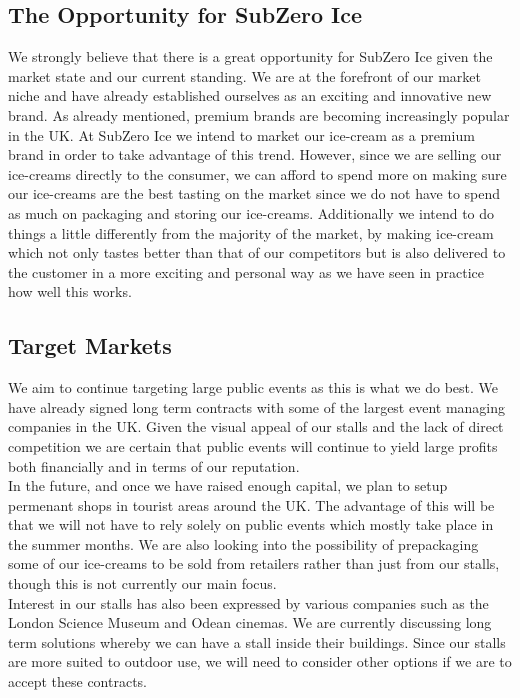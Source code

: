 \documentclass{article}
\begin{document}
  \subsection{The Opportunity for SubZero Ice}

  We strongly believe that there is a great opportunity for SubZero Ice given the market state and our current standing. We are at the forefront of our market niche and have already established ourselves as an exciting and innovative new brand. As already mentioned, premium brands are becoming increasingly popular in the UK. At SubZero Ice we intend to market our ice-cream as a premium brand in order to take advantage of this trend. However, since we are selling our ice-creams directly to the consumer, we can afford to spend more on making sure our ice-creams are the best tasting on the market since we do not have to spend as much on packaging and storing our ice-creams. Additionally we intend to do things a little differently from the majority of the market, by making ice-cream which not only tastes better than that of our competitors but is also delivered to the customer in a more exciting and personal way as we have seen in practice how well this works. \\


  \subsection{Target Markets}

  We aim to continue targeting large public events as this is what we do best. We have already signed long term contracts with some of the largest event managing companies in the UK. Given the visual appeal of our stalls and the lack of direct competition we are certain that public events will continue to yield large profits both financially and in terms of our reputation. \\

  In the future, and once we have raised enough capital, we plan to setup permenant shops in tourist areas around the UK. The advantage of this will be that we will not have to rely solely on public events which mostly take place in the summer months. We are also looking into the possibility of prepackaging some of our ice-creams to be sold from retailers rather than just from our stalls, though this is not currently our main focus. \\

  Interest in our stalls has also been expressed by various companies such as the London Science Museum and Odean cinemas. We are currently discussing long term solutions whereby we can have a stall inside their buildings. Since our stalls are more suited to outdoor use, we will need to consider other options if we are to accept these contracts. \\
\end{document}
